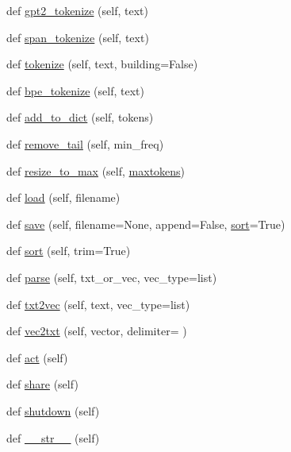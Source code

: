 \begin{DoxyCompactItemize}
\item 
def \hyperlink{classparlai_1_1core_1_1dict_1_1DictionaryAgent_a57685af2fcd0a684b7102c55afe0c8ad}{gpt2\+\_\+tokenize} (self, text)
\item 
def \hyperlink{classparlai_1_1core_1_1dict_1_1DictionaryAgent_a8fede3cf83af6a47c5dd4bb356de3350}{span\+\_\+tokenize} (self, text)
\item 
def \hyperlink{classparlai_1_1core_1_1dict_1_1DictionaryAgent_aca7e5edfd6502701277cb83b75ff4e96}{tokenize} (self, text, building=False)
\item 
def \hyperlink{classparlai_1_1core_1_1dict_1_1DictionaryAgent_a520e4bc630cd60f075ad21632ef677a1}{bpe\+\_\+tokenize} (self, text)
\item 
def \hyperlink{classparlai_1_1core_1_1dict_1_1DictionaryAgent_acb28700c8c2725c05a8f3e28f11f8714}{add\+\_\+to\+\_\+dict} (self, tokens)
\item 
def \hyperlink{classparlai_1_1core_1_1dict_1_1DictionaryAgent_ae828063449b45112d82a97921d35c247}{remove\+\_\+tail} (self, min\+\_\+freq)
\item 
def \hyperlink{classparlai_1_1core_1_1dict_1_1DictionaryAgent_a1a800c1aecdb97986c59fd26f1b55626}{resize\+\_\+to\+\_\+max} (self, \hyperlink{classparlai_1_1core_1_1dict_1_1DictionaryAgent_abeece13fbdc77b7479d4fb5d02858816}{maxtokens})
\item 
def \hyperlink{classparlai_1_1core_1_1dict_1_1DictionaryAgent_aa4229d1ba17932f588e15067afd9bf42}{load} (self, filename)
\item 
def \hyperlink{classparlai_1_1core_1_1dict_1_1DictionaryAgent_a0c6a8d8b67fe978549b328e7b7b07450}{save} (self, filename=None, append=False, \hyperlink{classparlai_1_1core_1_1dict_1_1DictionaryAgent_a84cb4fabf5d0e92e3f80ac16bdfd0ccc}{sort}=True)
\item 
def \hyperlink{classparlai_1_1core_1_1dict_1_1DictionaryAgent_a84cb4fabf5d0e92e3f80ac16bdfd0ccc}{sort} (self, trim=True)
\item 
def \hyperlink{classparlai_1_1core_1_1dict_1_1DictionaryAgent_ad34c4135329f6768d22d519c3c483d68}{parse} (self, txt\+\_\+or\+\_\+vec, vec\+\_\+type=list)
\item 
def \hyperlink{classparlai_1_1core_1_1dict_1_1DictionaryAgent_abc3baf742422fc7cdaece698224709d4}{txt2vec} (self, text, vec\+\_\+type=list)
\item 
def \hyperlink{classparlai_1_1core_1_1dict_1_1DictionaryAgent_af2eeb50b2cd6cf3a8ca817b729ec7486}{vec2txt} (self, vector, delimiter=\textquotesingle{} \textquotesingle{})
\item 
def \hyperlink{classparlai_1_1core_1_1dict_1_1DictionaryAgent_af34b92857b41748aafdecee34ebf9345}{act} (self)
\item 
def \hyperlink{classparlai_1_1core_1_1dict_1_1DictionaryAgent_a3d8996e367685451f7de85e8284243d7}{share} (self)
\item 
def \hyperlink{classparlai_1_1core_1_1dict_1_1DictionaryAgent_aea9aca40dd1bb1976f4042565b172d88}{shutdown} (self)
\item 
def \hyperlink{classparlai_1_1core_1_1dict_1_1DictionaryAgent_a4b822841903bedb2b0f866e7bd17f3fa}{\+\_\+\+\_\+str\+\_\+\+\_\+} (self)
\end{DoxyCompactItemize}
